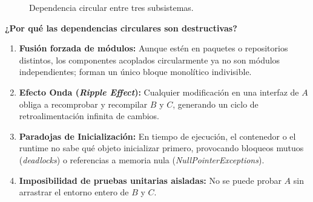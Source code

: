 \begin{figure}[htbp]
\centering
{}
\caption{Dependencia circular entre tres subsistemas.}
\label{fig:dependencia-circular}
\end{figure}

\textbf{¿Por qué las dependencias circulares son destructivas?}
\begin{enumerate}[leftmargin=1.5em]
  \item \textbf{Fusión forzada de módulos:} Aunque estén en paquetes o repositorios distintos, los componentes acoplados circularmente ya no son módulos independientes; forman un único bloque monolítico indivisible.
  \item \textbf{Efecto Onda (\emph{Ripple Effect}):} Cualquier modificación en una interfaz de $A$ obliga a recomprobar y recompilar $B$ y $C$, generando un ciclo de retroalimentación infinita de cambios.
  \item \textbf{Paradojas de Inicialización:} En tiempo de ejecución, el contenedor o el runtime no sabe qué objeto inicializar primero, provocando bloqueos mutuos (\emph{deadlocks}) o referencias a memoria nula (\emph{NullPointerExceptions}).
  \item \textbf{Imposibilidad de pruebas unitarias aisladas:} No se puede probar $A$ sin arrastrar el entorno entero de $B$ y $C$.
\end{enumerate}

